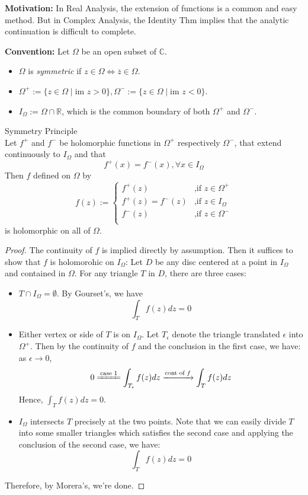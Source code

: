 \noindent\textbf{Motivation:} In Real Analysis, the extension of functions is a common and easy method. But in Complex Analysis, the Identity Thm implies that the analytic continuation is difficult to complete.

\noindent\textbf{Convention:} Let $\Omega$ be an open subset of $\mathbb{C}$.
\begin{itemize}
    \item $\Omega$ is \textit{symmetric} if $z\in \Omega \Leftrightarrow \overline{z} \in \Omega$.
    \item $\Omega^+:= \{z\in \Omega \mid \text{im }z>0\}, \Omega^-:= \{ z\in \Omega \mid \text{im }z<0\}$.
    \item $I_{\Omega} := \Omega \cap \mathbb{R}$, which is the common boundary of both $\Omega^+$ and $\Omega^-$.
\end{itemize}

\begin{lemma}{Symmetry Principle}\\
Let $f^+$ and $f^-$ be holomorphic functions in $\Omega^+$ respectively $\Omega^-$, that extend continuously to $I_\Omega$ and that
\[
f^+(x)= f^-(x) ,\forall x\in I_\Omega
\]
Then $f$ defined on $\Omega$ by
\[
f(z):= \begin{cases}
    f^+(z) &\text{,if }z\in \Omega^+\\
    f^+(z)=f^-(z) &\text{,if }z\in I_\Omega\\
    f^-(z) &\text{,if }z\in \Omega^-\\
\end{cases}
\]
is holomorphic on all of $\Omega$.
\end{lemma}

\begin{proof}
    The continuity of $f$ is implied directly by assumption. Then it suffices to show that $f$ is holomorohic on $I_\Omega$: Let $D$ be any disc centered at a point in $I_\Omega$ and contained in $\Omega$. For any triangle $T$ in $D$, there are three cases:
    \begin{itemize}
        \item $T\cap I_\Omega =\emptyset$. By Gourset's, we have
        \[
        \int_T f(z)dz=0
        \]
        \item Either vertex or side of $T$ is on $I_\Omega$. Let $T_\epsilon$ denote the triangle translated $\epsilon$ into $\Omega^+$. Then by the continuity of $f$ and the conclusion in the first case, we have: as $\epsilon \to 0$,
        \[
        0 \xlongequal{\text{case 1}} \int_{T_\epsilon} f(z)dz \xrightarrow{\text{cont of }f} \int_T f(z)dz
        \]
        Hence, $\int_T f(z)dz=0$.

        \item $I_\Omega$ intersects $T$ precisely at the two points. Note that we can easily divide $T$ into some smaller triangles which satisfies the second case and applying the conclusion of the second case, we have:
        \[
        \int_T f(z)dz=0
        \]
    \end{itemize}
    Therefore, by Morera's, we're done.
\end{proof}

